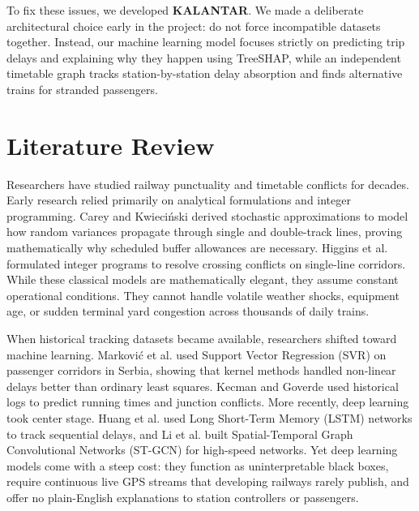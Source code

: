 \documentclass[11pt,a4paper]{article}
\begin{document}
To fix these issues, we developed \textbf{KALANTAR}. We made a deliberate architectural choice early in the project: do not force incompatible datasets together. Instead, our machine learning model focuses strictly on predicting trip delays and explaining why they happen using TreeSHAP, while an independent timetable graph tracks station-by-station delay absorption and finds alternative trains for stranded passengers.

\section{Literature Review}

Researchers have studied railway punctuality and timetable conflicts for decades. Early research relied primarily on analytical formulations and integer programming. Carey and Kwieci{\'n}ski \cite{carey1994stochastic, carey1995reliability} derived stochastic approximations to model how random variances propagate through single and double-track lines, proving mathematically why scheduled buffer allowances are necessary. Higgins et al. \cite{higgins1998delay} formulated integer programs to resolve crossing conflicts on single-line corridors. While these classical models are mathematically elegant, they assume constant operational conditions. They cannot handle volatile weather shocks, equipment age, or sudden terminal yard congestion across thousands of daily trains.

When historical tracking datasets became available, researchers shifted toward machine learning. Markovi{\'c} et al. \cite{markovic2015analyzing} used Support Vector Regression (SVR) on passenger corridors in Serbia, showing that kernel methods handled non-linear delays better than ordinary least squares. Kecman and Goverde \cite{kecman2015predicting} used historical logs to predict running times and junction conflicts. More recently, deep learning took center stage. Huang et al. \cite{huang2020deep} used Long Short-Term Memory (LSTM) networks to track sequential delays, and Li et al. \cite{li2021spatial} built Spatial-Temporal Graph Convolutional Networks (ST-GCN) for high-speed networks. Yet deep learning models come with a steep cost: they function as uninterpretable black boxes, require continuous live GPS streams that developing railways rarely publish, and offer no plain-English explanations to station controllers or passengers.
\end{document}
